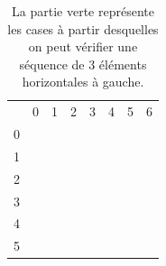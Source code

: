 \documentclass[a4paper, 11pt, oneside]{article}
\begin{document}
\begin{table}[h]
\centering
\begin{tabular}{llllllll}
 & 0 & 1 & 2 & 3 & 4 & 5 & 6 \\ \cline{2-8} 
\multicolumn{1}{l|}{0} & \multicolumn{1}{l|}{\cellcolor[HTML]{FE0000}} & \multicolumn{1}{l|}{\cellcolor[HTML]{FE0000}} & \multicolumn{1}{l|}{\cellcolor[HTML]{FE0000}} & \multicolumn{1}{l|}{\cellcolor[HTML]{34FF34}} & \multicolumn{1}{l|}{\cellcolor[HTML]{34FF34}} & \multicolumn{1}{l|}{\cellcolor[HTML]{34FF34}} & \multicolumn{1}{l|}{\cellcolor[HTML]{34FF34}} \\ \cline{2-8} 
\multicolumn{1}{l|}{1} & \multicolumn{1}{l|}{\cellcolor[HTML]{FE0000}} & \multicolumn{1}{l|}{\cellcolor[HTML]{FE0000}} & \multicolumn{1}{l|}{\cellcolor[HTML]{FE0000}} & \multicolumn{1}{l|}{\cellcolor[HTML]{34FF34}} & \multicolumn{1}{l|}{\cellcolor[HTML]{34FF34}} & \multicolumn{1}{l|}{\cellcolor[HTML]{34FF34}} & \multicolumn{1}{l|}{\cellcolor[HTML]{34FF34}} \\ \cline{2-8} 
\multicolumn{1}{l|}{2} & \multicolumn{1}{l|}{\cellcolor[HTML]{FE0000}} & \multicolumn{1}{l|}{\cellcolor[HTML]{FE0000}} & \multicolumn{1}{l|}{\cellcolor[HTML]{FE0000}} & \multicolumn{1}{l|}{\cellcolor[HTML]{34FF34}} & \multicolumn{1}{l|}{\cellcolor[HTML]{34FF34}} & \multicolumn{1}{l|}{\cellcolor[HTML]{34FF34}} & \multicolumn{1}{l|}{\cellcolor[HTML]{34FF34}} \\ \cline{2-8} 
\multicolumn{1}{l|}{3} & \multicolumn{1}{l|}{\cellcolor[HTML]{FE0000}} & \multicolumn{1}{l|}{\cellcolor[HTML]{FE0000}} & \multicolumn{1}{l|}{\cellcolor[HTML]{FE0000}} & \multicolumn{1}{l|}{\cellcolor[HTML]{34FF34}} & \multicolumn{1}{l|}{\cellcolor[HTML]{34FF34}} & \multicolumn{1}{l|}{\cellcolor[HTML]{34FF34}} & \multicolumn{1}{l|}{\cellcolor[HTML]{34FF34}} \\ \cline{2-8} 
\multicolumn{1}{l|}{4} & \multicolumn{1}{l|}{\cellcolor[HTML]{FE0000}} & \multicolumn{1}{l|}{\cellcolor[HTML]{FE0000}} & \multicolumn{1}{l|}{\cellcolor[HTML]{FE0000}} & \multicolumn{1}{l|}{\cellcolor[HTML]{34FF34}} & \multicolumn{1}{l|}{\cellcolor[HTML]{34FF34}} & \multicolumn{1}{l|}{\cellcolor[HTML]{34FF34}} & \multicolumn{1}{l|}{\cellcolor[HTML]{34FF34}} \\ \cline{2-8} 
\multicolumn{1}{l|}{5} & \multicolumn{1}{l|}{\cellcolor[HTML]{FE0000}} & \multicolumn{1}{l|}{\cellcolor[HTML]{FE0000}} & \multicolumn{1}{l|}{\cellcolor[HTML]{FE0000}} & \multicolumn{1}{l|}{\cellcolor[HTML]{34FF34}} & \multicolumn{1}{l|}{\cellcolor[HTML]{34FF34}} & \multicolumn{1}{l|}{\cellcolor[HTML]{34FF34}} & \multicolumn{1}{l|}{\cellcolor[HTML]{34FF34}} \\ \cline{2-8} 
\end{tabular}
\caption{La partie verte représente les cases à partir desquelles on peut vérifier une séquence de 3 éléments horizontales à gauche.}
\label{table-1}
\end{table}
\end{document}
